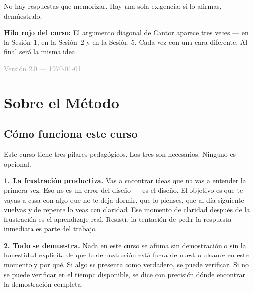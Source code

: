 \documentclass[11pt, letterpaper]{article}
\begin{document}
\begin{titlepage}
\begin{center}
\begin{tcolorbox}[
  colback=mitred!4, colframe=mitred,
  boxrule=0.8pt, left=10pt, right=10pt, top=8pt, bottom=8pt]
{\medskip
No hay respuestas que memorizar. Hay una sola exigencia:
si lo afirmas, dem\'uestralo.}
\end{tcolorbox}

\vspace{1.2cm}

\begin{tcolorbox}[
  colback=white, colframe=diagonalred,
  boxrule=0.6pt, left=8pt, right=8pt, top=6pt, bottom=6pt]
{\footnotesize\textbf{Hilo rojo del curso:} El argumento diagonal de Cantor aparece
tres veces --- en la Sesi\'on~1, en la Sesi\'on~2 y en la Sesi\'on~5.
Cada vez con una cara diferente. Al final ser\'a la misma idea.}
\end{tcolorbox}

\vfill
{\small\textcolor{darkgray}{Versi\'on 2.0 --- \today}}
\end{center}
\end{titlepage}

\tableofcontents
\newpage

\section*{Sobre el M\'etodo}

\subsection*{C\'omo funciona este curso}

Este curso tiene tres pilares pedag\'ogicos. Los tres son necesarios. Ninguno es opcional.

\textbf{1. La frustraci\'on productiva.}
Vas a encontrar ideas que no vas a entender la primera vez. Eso no es un error del dise\~no --- es el dise\~no. El objetivo es que te vayas a casa con algo que no te deja dormir, que lo pienses, que al d\'ia siguiente vuelvas y de repente lo veas con claridad. Ese momento de claridad despu\'es de la frustraci\'on es el aprendizaje real. Resistir la tentaci\'on de pedir la respuesta inmediata es parte del trabajo.

\textbf{2. Todo se demuestra.}
Nada en este curso se afirma sin demostraci\'on o sin la honestidad expl\'icita de que la demostraci\'on est\'a fuera de nuestro alcance en este momento y por qu\'e. Si algo se presenta como verdadero, se puede verificar. Si no se puede verificar en el tiempo disponible, se dice con precisi\'on d\'onde encontrar la demostraci\'on completa.
\end{document}
